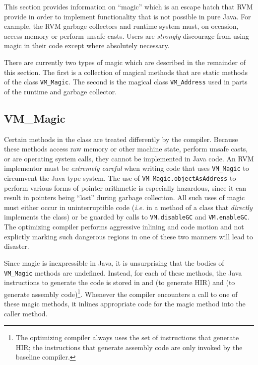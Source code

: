 This section provides information on ``magic'' which is an escape
hatch that RVM provide in order to implement functionality that is not
possible in pure Java\trademark.  For example, the RVM garbage collectors and
runtime system must, on occasion, access memory or perform unsafe
casts.  Users are {\it strongly} discourage from using magic in their code
except where absolutely necessary.  

There are currently two types of magic which are described in the remainder of this
section.  The first is a collection of magical methods
that are static methods of the class {\tt VM\_Magic}.  The second is the magical class
{\tt VM\_Address} used in parts of the runtime and garbage collector.

\subsection{VM\_Magic}
Certain methods in the class 
are treated differently by the compiler. Because these methods access
raw memory or other machine state, perform unsafe casts, 
or are operating system calls, they cannot be implemented in Java
code.  An RVM implementor must be {\em extremely careful} when writing
code that uses {\tt VM\_Magic} to circumvent the Java type
system.  The use of {\tt VM\_Magic.objectAsAddress} to perform various
forms of pointer arithmetic is especially hazardous, since it can
result in pointers being ``lost'' during garbage collection. 
All such uses of magic must either occur in uninterruptible
code ({\it i.e.} in a method of a class that {\em directly} implements 
the  class) 
or be guarded by calls to {\tt VM.disableGC} and {\tt VM.enableGC}.  
The optimizing compiler performs aggressive inlining and code motion 
and not explictly marking such dangerous regions in one of these two manners 
will lead to disaster.

Since magic is inexpressible in Java, it is unsurprising that the bodies 
of {\tt VM\_Magic} methods are undefined.  Instead, for each of these methods, 
the Java instructions to generate the code is stored in 
 and 
 (to generate HIR) and 
 (to generate assembly code)\footnote{The optimizing
compiler always uses the set of instructions that generate HIR; the
instructions that generate assembly code are only invoked by the
baseline compiler.}.  Whenever the compiler encounters a call to one of these
magic methods, it inlines appropriate code for the magic method into the caller method.

